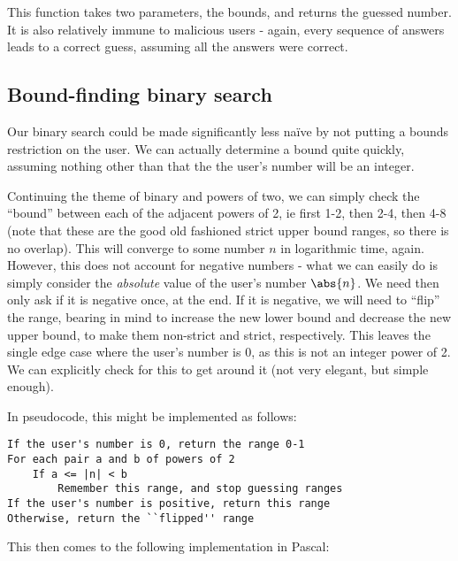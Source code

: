 \documentclass[fleqn,a4paper,11pt]{article}
\begin{document}
    This function takes two parameters, the bounds, and returns the guessed
    number. It is also relatively immune to malicious users - again, every
    sequence of answers leads to a correct guess, assuming all the answers were
    correct.

    \subsection{Bound-finding binary search}

    Our binary search could be made significantly less na\"ive by not putting a
    bounds restriction on the user. We can actually determine a bound quite
    quickly, assuming nothing other than that the the user's number will be an
    integer.

    Continuing the theme of binary and powers of two, we can simply check the
    ``bound'' between each of the adjacent powers of 2, ie first 1-2, then 2-4,
    then 4-8 (note that these are the good old fashioned strict upper bound
    ranges, so there is no overlap). This will converge to some number $n$ in
    logarithmic time, again. However, this does not account for negative
    numbers - what we can easily do is simply consider the \emph{absolute}
    value of the user's number $\abs{n}$. We need then only ask if it is
    negative once, at the end. If it is negative, we will need to ``flip'' the
    range, bearing in mind to increase the new lower bound and decrease the new
    upper bound, to make them non-strict and strict, respectively. This leaves
    the single edge case where the user's number is 0, as this is not an
    integer power of 2. We can explicitly check for this to get around it (not
    very elegant, but simple enough).

    In pseudocode, this might be implemented as follows:

\begin{lstlisting}[caption=Bound-finding pseudocode]
If the user's number is 0, return the range 0-1
For each pair a and b of powers of 2
    If a <= |n| < b
        Remember this range, and stop guessing ranges
If the user's number is positive, return this range
Otherwise, return the ``flipped'' range
\end{lstlisting}

    This then comes to the following implementation in Pascal:
\end{document}
